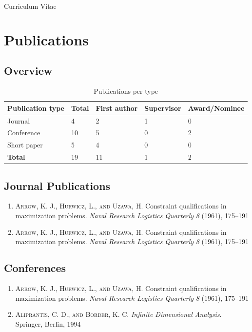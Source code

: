 \documentclass[11pt,a4paper]{article}
\makeatletter
\newcommand{\ArrowCitation}{%
    \textsc{Arrow, K. J., Hurwicz, L., and Uzawa, H\@.}
    Constraint qualifications in maximization problems.
    \emph{Naval Research Logistics Quarterly} \emph{8} (1961), 175--191%
}
\newcommand{\AliprantisCitation}{%
    \textsc{Aliprantis, C. D., and Border, K. C\@.}
    \emph{Infinite Dimensional Analysis}. Springer, Berlin, 1994%
}
\makeatother
\begin{document}
\begin{cv}{Curriculum Vitae}
\begin{cvlist}{}
\end{cvlist}

%
\section{Publications}

\subsection{Overview}

\begin{table}[!ht]
\centering
\begin{tabular}{l|l|l|l|l}
\hline
Publication type     & Total & First author & Supervisor & Award/Nominee \\ \hline
Journal              & 4     & 2            & 1          & 0             \\
Conference           & 10    & 5            & 0          & 2             \\
Short paper          & 5     & 4            & 0          & 0             \\ \hline
\textbf{Total}       & 19    & 11           & 1          & 2             \\ \hline
\end{tabular}
\caption{Publications per type}
\end{table}

\subsection{Journal Publications}
\begin{cvlist}{}
    \item
        \begin{enumerate}[leftmargin=-2cm]
            \item \ArrowCitation
            \item \ArrowCitation
        \end{enumerate}
\end{cvlist}
\subsection{Conferences}
\begin{cvlist}{}
    \item
        \begin{enumerate}[resume,leftmargin=-2cm]
            \item \ArrowCitation
            \item \AliprantisCitation
        \end{enumerate}
\end{cvlist}

\end{cv}
\end{document}
